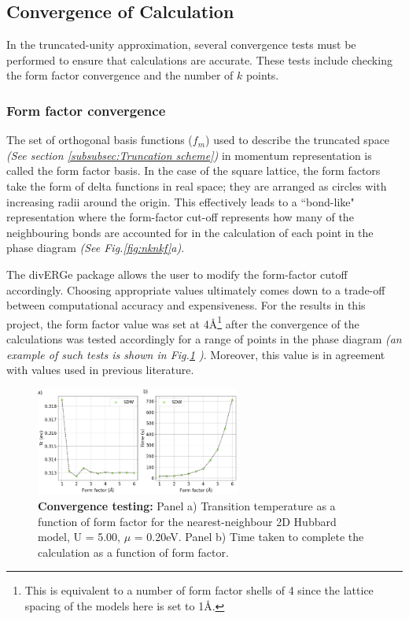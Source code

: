 \documentclass[11pt]{article}
\begin{document}
\subsection{Convergence of Calculation}
\label{subsec:convergence}
In the truncated-unity approximation, several convergence tests must be performed to ensure that calculations are accurate.
These tests include checking the form factor convergence and the number of $k$ points.

\subsubsection{Form factor convergence}

The set of orthogonal basis functions ($f_m$) used to describe the truncated space \textit{(See section \ref{subsubsec:Truncation scheme})}
in momentum representation is called the form factor basis\cite{lichtenstein2018functional}. In the case of the square lattice, 
the form factors take the form of delta functions in real space; they are arranged as circles with increasing radii around the origin. This effectively leads to a ``bond-like" representation where the form-factor cut-off
represents how many of the neighbouring bonds are accounted for in the calculation of each point in the phase diagram \textit{(See Fig.\ref{fig:nknkf}a)}.\par

\medskip


\noindent The divERGe package allows the user to modify the form-factor cutoff accordingly. Choosing appropriate values ultimately comes down to a trade-off 
between computational accuracy and expensiveness. 
For the results in this project, the form factor value was set at 4\AA\footnote{This is equivalent to a number of form factor shells of 4 since the lattice spacing of the models here is set to 1\AA.} after the convergence of  
the calculations was tested accordingly for a range of points in the phase diagram \textit{(an example of such tests is shown in Fig.\ref{fig:Formfactorconvergence} )}. Moreover, this value is in agreement with values used in previous literature\cite{lichtenstein2018functional}. 

\begin{figure}[htbp]  %
    \centering
    \includegraphics[width=0.6\textwidth]{convergence.png}  %
    \caption{\textbf{Convergence testing:} Panel a) Transition temperature as a function of form factor for the nearest-neighbour 2D Hubbard model, U = 5.00, $\mu$ = 0.20eV. Panel b) Time taken to complete the calculation
    as a function of form factor.   }
    \label{fig:Formfactorconvergence}
\end{figure}
\end{document}
